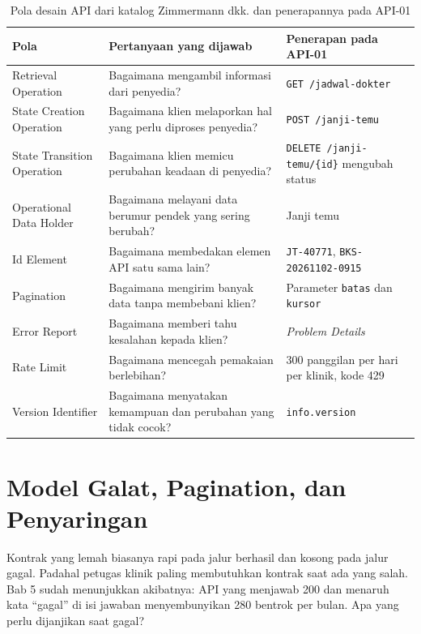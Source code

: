 \begin{table}[!htb]
  \centering
  \caption{Pola desain API dari katalog Zimmermann dkk. dan penerapannya pada API-01}
  \label{tab:ch09-pola}
  \footnotesize
  \begin{tabularx}{\textwidth}{H{2.8cm}GG}
    \hline
    \textbf{Pola} & \textbf{Pertanyaan yang dijawab} & \textbf{Penerapan pada API-01} \\ \hline
    Retrieval Operation & Bagaimana mengambil informasi dari penyedia? & \texttt{GET /jadwal-dokter} \\ \hline
    State Creation Operation & Bagaimana klien melaporkan hal yang perlu diproses penyedia? & \texttt{POST /janji-temu} \\ \hline
    State Transition Operation & Bagaimana klien memicu perubahan keadaan di penyedia? & \texttt{DELETE /janji-temu/\{id\}} mengubah status \\ \hline
    Operational Data Holder & Bagaimana melayani data berumur pendek yang sering berubah? & Janji temu \\ \hline
    Id Element & Bagaimana membedakan elemen API satu sama lain? & \texttt{JT-40771}, \texttt{BKS-20261102-0915} \\ \hline
    Pagination & Bagaimana mengirim banyak data tanpa membebani klien? & Parameter \texttt{batas} dan \texttt{kursor} \\ \hline
    Error Report & Bagaimana memberi tahu kesalahan kepada klien? & \textit{Problem Details} \\ \hline
    Rate Limit & Bagaimana mencegah pemakaian berlebihan? & 300 panggilan per hari per klinik, kode 429 \\ \hline
    Version Identifier & Bagaimana menyatakan kemampuan dan perubahan yang tidak cocok? & \texttt{info.version} \\ \hline
  \end{tabularx}
\end{table}

\section{Model Galat, Pagination, dan Penyaringan}

Kontrak yang lemah biasanya rapi pada jalur berhasil dan kosong pada jalur gagal. Padahal petugas klinik paling membutuhkan kontrak saat ada
yang salah. Bab 5 sudah menunjukkan akibatnya: API yang menjawab 200 dan menaruh kata ``gagal'' di isi jawaban menyembunyikan 280 bentrok per
bulan. Apa yang perlu dijanjikan saat gagal?

